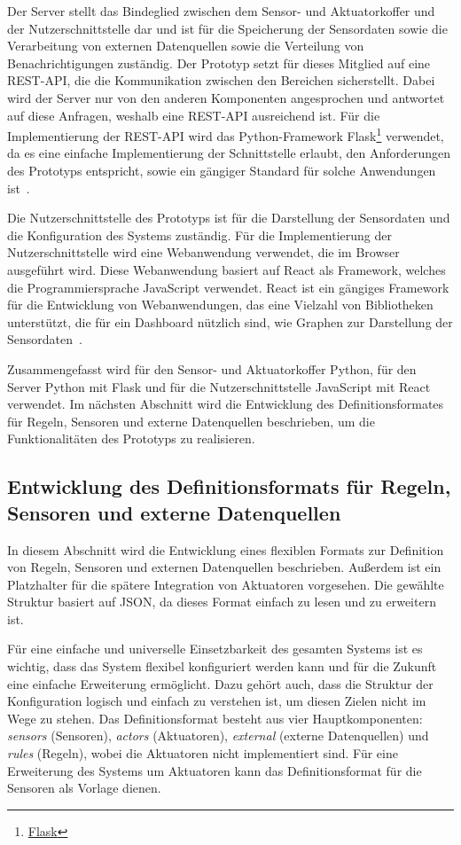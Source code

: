 Der Server stellt das Bindeglied zwischen dem Sensor- und Aktuatorkoffer und der Nutzerschnittstelle dar und ist für die Speicherung der Sensordaten sowie die Verarbeitung von externen Datenquellen sowie die Verteilung von Benachrichtigungen zuständig.
Der Prototyp setzt für dieses Mitglied auf eine REST-API, die die Kommunikation zwischen den Bereichen sicherstellt.
Dabei wird der Server nur von den anderen Komponenten angesprochen und antwortet auf diese Anfragen, weshalb eine REST-API ausreichend ist.
Für die Implementierung der REST-API wird das Python-Framework Flask\footnote{\href{https://flask.palletsprojects.com/en/latest/}{Flask}} verwendet, da es eine einfache Implementierung der Schnittstelle erlaubt, den Anforderungen des Prototyps entspricht, sowie ein gängiger Standard für solche Anwendungen ist~\cite{FlaskUsage}.

Die Nutzerschnittstelle des Prototyps ist für die Darstellung der Sensordaten und die Konfiguration des Systems zuständig.
Für die Implementierung der Nutzerschnittstelle wird eine Webanwendung verwendet, die im Browser ausgeführt wird.
Diese Webanwendung basiert auf React als Framework, welches die Programmiersprache JavaScript verwendet.
React ist ein gängiges Framework für die Entwicklung von Webanwendungen, das eine Vielzahl von Bibliotheken unterstützt, die für ein Dashboard nützlich sind, wie Graphen zur Darstellung der Sensordaten~\cite{ReactUsage}.

Zusammengefasst wird für den Sensor- und Aktuatorkoffer Python, für den Server Python mit Flask und für die Nutzerschnittstelle JavaScript mit React verwendet.
Im nächsten Abschnitt wird die Entwicklung des Definitionsformates für Regeln, Sensoren und externe Datenquellen beschrieben, um die Funktionalitäten des Prototyps zu realisieren.


\subsection{Entwicklung des Definitionsformats für Regeln, Sensoren und externe Datenquellen}
In diesem Abschnitt wird die Entwicklung eines flexiblen Formats zur Definition von Regeln, Sensoren und externen Datenquellen beschrieben.
Außerdem ist ein Platzhalter für die spätere Integration von Aktuatoren vorgesehen.
Die gewählte Struktur basiert auf JSON, da dieses Format einfach zu lesen und zu erweitern ist.

Für eine einfache und universelle Einsetzbarkeit des gesamten Systems ist es wichtig, dass das System flexibel konfiguriert werden kann und für die Zukunft eine einfache Erweiterung ermöglicht.
Dazu gehört auch, dass die Struktur der Konfiguration logisch und einfach zu verstehen ist, um diesen Zielen nicht im Wege zu stehen.
Das Definitionsformat besteht aus vier Hauptkomponenten: \emph{sensors} (Sensoren), \emph{actors} (Aktuatoren), \emph{external} (externe Datenquellen) und \emph{rules} (Regeln), wobei die Aktuatoren nicht implementiert sind.
Für eine Erweiterung des Systems um Aktuatoren kann das Definitionsformat für die Sensoren als Vorlage dienen.


